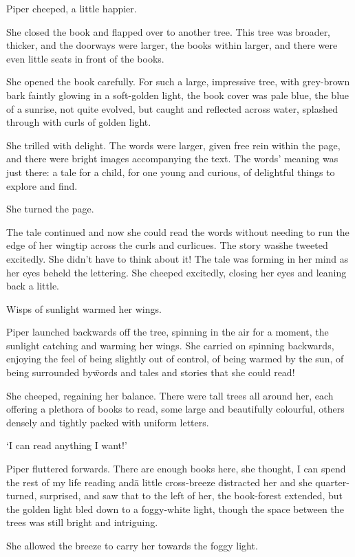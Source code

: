 Piper cheeped, a little happier.

She closed the book and flapped over to another tree. This tree was
broader, thicker, and the doorways were larger, the books within
larger, and there were even little seats in front of the books.

She opened the book carefully. For such a large, impressive tree, with
grey-brown bark faintly glowing in a soft-golden light, the book cover
was pale blue, the blue of a sunrise, not quite evolved, but caught
and reflected across water, splashed through with curls of golden
light.

She trilled with delight. The words were larger, given free rein
within the page, and there were bright images accompanying the
text. The words' meaning was just there: a tale for a child, for one
young and curious, of delightful things to explore and find.

She turned the page.

The tale continued and now she could read the words without needing to
run the edge of her wingtip across the curls and curlicues. The story
was\=she tweeted excitedly. She didn't have to think about it! The
tale was forming in her mind as her eyes beheld the lettering.  She
cheeped excitedly, closing her eyes and leaning back a little.

Wisps of sunlight warmed her wings.

Piper launched backwards off the tree, spinning in the air for a
moment, the sunlight catching and warming her wings. She carried on
spinning backwards, enjoying the feel of being slightly out of
control, of being warmed by the sun, of being surrounded by\=words and
tales and stories that she could read!

She cheeped, regaining her balance. There were tall trees all around
her, each offering a plethora of books to read, some large and
beautifully colourful, others densely and tightly packed with uniform
letters.

`I can read anything I want!'

Piper fluttered forwards. There are enough books here, she thought, I
can spend the rest of my life reading and\=a little cross-breeze
distracted her and she quarter-turned, surprised, and saw that to the
left of her, the book-forest extended, but the golden light bled down
to a foggy-white light, though the space between the trees was still
bright and intriguing.

She allowed the breeze to carry her towards the foggy light.

